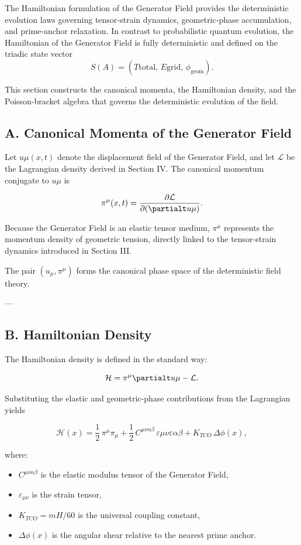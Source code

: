\documentclass[reprint,amsmath,amssymb,aps,prl,floatfix]{revtex4-2}
\begin{document}
The Hamiltonian formulation of the Generator Field provides the deterministic evolution laws governing tensor‑strain dynamics, geometric‑phase accumulation, and prime‑anchor relaxation. In contrast to probabilistic quantum evolution, the Hamiltonian of the Generator Field is fully deterministic and defined on the triadic state vector  
\[
S(A) = (T{\mathrm{total}},\,E{\mathrm{grid}},\,\phi_{\mathrm{geom}}).
\]

This section constructs the canonical momenta, the Hamiltonian density, and the Poisson‑bracket algebra that governs the deterministic evolution of the field.

\subsection{A. Canonical Momenta of the Generator Field}

Let \(u\mu(x,t)\) denote the displacement field of the Generator Field, and let \(\mathcal{L}\) be the Lagrangian density derived in Section IV. The canonical momentum conjugate to \(u\mu\) is

\[
\pi^\mu(x,t) = \frac{\partial \mathcal{L}}{\partial (\partialt u\mu)}.
\]

Because the Generator Field is an elastic tensor medium, \(\pi^\mu\) represents the momentum density of geometric tension, directly linked to the tensor‑strain dynamics introduced in Section III.

The pair \((u_\mu, \pi^\mu)\) forms the canonical phase space of the deterministic field theory.

---

\subsection{B. Hamiltonian Density}

The Hamiltonian density is defined in the standard way:

\[
\mathcal{H} = \pi^\mu \partialt u\mu - \mathcal{L}.
\]

Substituting the elastic and geometric‑phase contributions from the Lagrangian yields

\[
\mathcal{H}(x) = 
\frac{1}{2}\,\pi^\mu \pi_\mu
+ \frac{1}{2}\,C^{\mu\nu\alpha\beta}\,\varepsilon{\mu\nu}\varepsilon{\alpha\beta}
+ K_{TCO}\,\Delta\phi(x),
\]

where:
\begin{itemize}
\item \(C^{\mu\nu\alpha\beta}\) is the elastic modulus tensor of the Generator Field,  
\item \(\varepsilon_{\mu\nu}\) is the strain tensor,  
\item \(K_{TCO} = mH/60\) is the universal coupling constant,  
\item \(\Delta\phi(x)\) is the angular shear relative to the nearest prime anchor.
\end{itemize}
\end{document}
